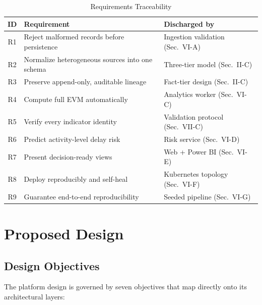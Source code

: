 \documentclass[conference]{IEEEtran}
\begin{document}
\begin{table}[t]
\caption{Requirements Traceability}
\label{tab:reqs}
\centering
\scriptsize
\setlength{\tabcolsep}{3pt}
\begin{tabular}{@{}cp{3.0cm}p{2.2cm}@{}}
\toprule
\textbf{ID} & \textbf{Requirement} & \textbf{Discharged by} \\
\midrule
R1 & Reject malformed records before persistence & Ingestion validation (Sec.~VI-A) \\
R2 & Normalize heterogeneous sources into one schema & Three-tier model (Sec.~II-C) \\
R3 & Preserve append-only, auditable lineage & Fact-tier design (Sec.~II-C) \\
R4 & Compute full EVM automatically & Analytics worker (Sec.~VI-C) \\
R5 & Verify every indicator identity & Validation protocol (Sec.~VII-C) \\
R6 & Predict activity-level delay risk & Risk service (Sec.~VI-D) \\
R7 & Present decision-ready views & Web + Power BI (Sec.~VI-E) \\
R8 & Deploy reproducibly and self-heal & Kubernetes topology (Sec.~VI-F) \\
R9 & Guarantee end-to-end reproducibility & Seeded pipeline (Sec.~VI-G) \\
\bottomrule
\end{tabular}
\end{table}

\section{Proposed Design}

\subsection{Design Objectives}

The platform design is governed by seven objectives that map directly onto its architectural layers:
\end{document}
